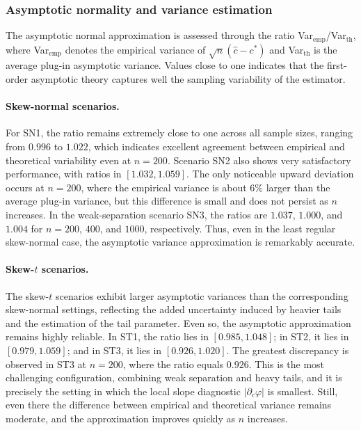 \documentclass[11pt,a4paper]{article}
\theoremstyle{definition}
\theoremstyle{remark}
\newcommand{\1}{\mathbf{1}}
\begin{document}
\subsubsection{Asymptotic normality and variance estimation}

The asymptotic normal approximation is assessed through the ratio
Var$_{\mathrm{emp}}$/Var$_{\mathrm{th}}$, where Var$_{\mathrm{emp}}$
denotes the empirical variance of $\sqrt n(\hat c-c^*)$ and
Var$_{\mathrm{th}}$ is the average plug-in asymptotic variance. Values
close to one indicates that the first-order asymptotic theory captures well the sampling variability of the estimator.

\paragraph{Skew-normal scenarios.}
For SN1, the ratio remains extremely close to one across all sample
sizes, ranging from $0.996$ to $1.022$, which indicates excellent
agreement between empirical and theoretical variability even at
$n=200$. Scenario SN2 also shows very satisfactory performance, with
ratios in $[1.032,1.059]$. The only noticeable upward deviation occurs
at $n=200$, where the empirical variance is about $6\%$ larger than the
average plug-in variance, but this difference is small and does not
persist as $n$ increases. In the weak-separation scenario SN3, the
ratios are $1.037$, $1.000$, and $1.004$ for $n=200$, $400$, and
$1000$, respectively. Thus, even in the least regular skew-normal case,
the asymptotic variance approximation is remarkably accurate.

\paragraph{Skew-$t$ scenarios.}
The skew-$t$ scenarios exhibit larger asymptotic variances than the
corresponding skew-normal settings, reflecting the added uncertainty
induced by heavier tails and the estimation of the tail parameter. Even
so, the asymptotic approximation remains highly reliable. In ST1, the
ratio lies in $[0.985,1.048]$; in ST2, it lies in $[0.979,1.059]$; and
in ST3, it lies in $[0.926,1.020]$. The greatest discrepancy is
observed in ST3 at $n=200$, where the ratio equals $0.926$. This is the
most challenging configuration, combining weak separation and heavy
tails, and it is precisely the setting in which the local slope
diagnostic $|\partial_c\varphi|$ is smallest. Still, even there the
difference between empirical and theoretical variance remains moderate,
and the approximation improves quickly as $n$ increases.
\end{document}
